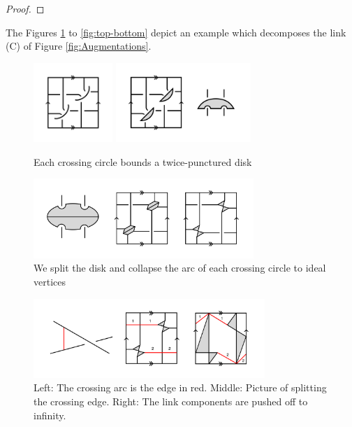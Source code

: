 \documentclass[11pt]{amsart}
\newcommand{\torus}{{\mathbb{T}^2}}
\theoremstyle{plain}
\theoremstyle{definition}
\begin{document}
\begin{proof}
\end{proof}




The Figures \ref{fig:step_one} to \ref{fig:top-bottom}
depict an example which decomposes the link (C) of Figure
\ref{fig:Augmentations}. 


\begin{figure}[h] 
\centering
\includegraphics[height=3cm]{fig-3.png}
\includegraphics[height=3cm]{fig-4.png}
	\caption{Each crossing circle bounds a twice-punctured disk}
	\label{fig:step_one}
\end{figure}
 
\begin{figure}[h] 
\centering 
\includegraphics[height=3cm]{fig-5.png} 
	\caption{We split the disk and collapse the arc of each
 crossing circle to ideal vertices}
	\label{fig:step_two}
\end{figure}


\begin{figure}[h] 
\centering 
\includegraphics[height=3cm]{fig-6.png} 
\caption{Left: The crossing arc is the edge in red.
Middle: Picture of splitting the crossing edge.
Right: The link components are pushed off to infinity.}
	\label{fig:step_three}
\end{figure}
\end{document}
